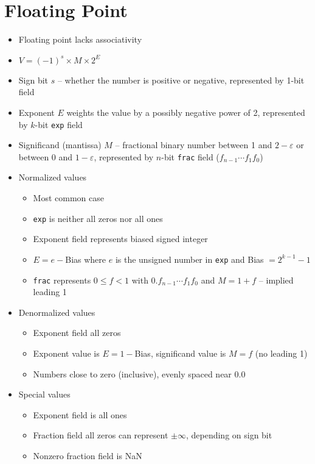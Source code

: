 \documentclass[twocolumn]{article}
\renewcommand{\tt}[1]{\texttt{#1}}
\begin{document}
\section{Floating Point}
\begin{itemize}[noitemsep]
    \item Floating point lacks associativity
    \item $V = (-1)^s \times M \times 2^E$
    \item Sign bit $s$ -- whether the number is positive or negative, represented by 1-bit field
    \item Exponent $E$ weights the value by a possibly negative power of 2, represented by $k$-bit \tt{exp} field
    \item Significand (mantissa) $M$ -- fractional binary number between 1 and $2 - \varepsilon$ or between 0 and $1 - \varepsilon$, represented by $n$-bit \tt{frac} field ($f_{n - 1}\cdots f_1 f_0$)
    \item Normalized values
    \begin{itemize}[noitemsep]
        \item Most common case
        \item \tt{exp} is neither all zeros nor all ones
        \item Exponent field represents biased signed integer
        \item $E = e - $Bias where $e$ is the unsigned number in \tt{exp} and Bias $= 2^{k - 1} - 1$
        \item \tt{frac} represents $0 \leq f < 1$ with $0.f_{n - 1}\cdots f_1 f_0$ and $M = 1 + f$ -- implied leading 1
    \end{itemize}
    \item Denormalized values
    \begin{itemize}[noitemsep]
        \item Exponent field all zeros
        \item Exponent value is $E = 1 - $Bias, significand value is $M = f$ (no leading 1)
        \item Numbers close to zero (inclusive), evenly spaced near 0.0
    \end{itemize}
    \item Special values
    \begin{itemize}[noitemsep]
        \item Exponent field is all ones
        \item Fraction field all zeros can represent $\pm \infty$, depending on sign bit
        \item Nonzero fraction field is NaN

\end{itemize}
\end{itemize}
\end{document}
